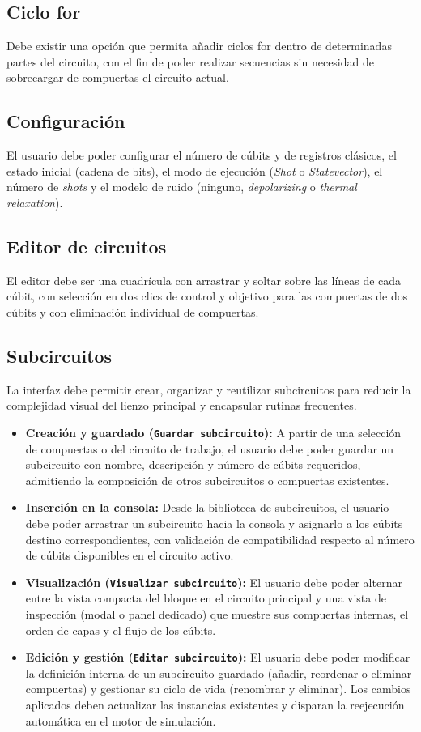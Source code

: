 \documentclass{article}
\begin{document}
\subsection{Ciclo for}
Debe existir una opción que permita añadir ciclos for dentro de determinadas partes del circuito, con el fin de poder realizar secuencias sin necesidad de sobrecargar de compuertas el circuito actual.

\subsection{Configuración}
El usuario debe poder configurar el número de cúbits y de registros clásicos, el estado inicial (cadena de bits), el modo de ejecución (\textit{Shot} o \textit{Statevector}), el número de \textit{shots} y el modelo de ruido (ninguno, \textit{depolarizing} o \textit{thermal relaxation}).

\subsection{Editor de circuitos}
El editor debe ser una cuadrícula con arrastrar y soltar sobre las líneas de cada cúbit, con selección en dos clics de control y objetivo para las compuertas de dos cúbits y con eliminación individual de compuertas.

\subsection{Subcircuitos}
La interfaz debe permitir crear, organizar y reutilizar subcircuitos para reducir la complejidad visual del lienzo principal y encapsular rutinas frecuentes.

\begin{itemize}
  \item \textbf{Creación y guardado (\texttt{Guardar subcircuito}):} A partir de una selección de compuertas o del circuito de trabajo, el usuario debe poder guardar un subcircuito con nombre, descripción y número de cúbits requeridos, admitiendo la composición de otros subcircuitos o compuertas existentes.
  \item \textbf{Inserción en la consola:} Desde la biblioteca de subcircuitos, el usuario debe poder arrastrar un subcircuito hacia la consola y asignarlo a los cúbits destino correspondientes, con validación de compatibilidad respecto al número de cúbits disponibles en el circuito activo.
  \item \textbf{Visualización (\texttt{Visualizar subcircuito}):} El usuario debe poder alternar entre la vista compacta del bloque en el circuito principal y una vista de inspección (modal o panel dedicado) que muestre sus compuertas internas, el orden de capas y el flujo de los cúbits.
  \item \textbf{Edición y gestión (\texttt{Editar subcircuito}):} El usuario debe poder modificar la definición interna de un subcircuito guardado (añadir, reordenar o eliminar compuertas) y gestionar su ciclo de vida (renombrar y eliminar). Los cambios aplicados deben actualizar las instancias existentes y disparan la reejecución automática
      en el motor de simulación.
\end{itemize}
\end{document}
